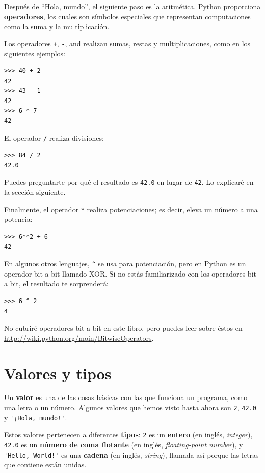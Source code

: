 \documentclass[10pt]{book}
\begin{document}
Después de ``Hola, mundo'', el siguiente paso es la aritmética.  Python
proporciona {\bf operadores}, los cuales son símbolos especiales que
representan computaciones como la suma y la multiplicación.

Los operadores {\tt +}, {\tt -}, and {\tt *} realizan sumas,
restas y multiplicaciones, como en los siguientes ejemplos:

\begin{verbatim}
>>> 40 + 2
42
>>> 43 - 1
42
>>> 6 * 7
42
\end{verbatim}
%
El operador {\tt /} realiza divisiones:

\begin{verbatim}
>>> 84 / 2
42.0
\end{verbatim}
%
Puedes preguntarte por qué el resultado es {\tt 42.0} en lugar de {\tt 42}.
Lo explicaré en la sección siguiente.

Finalmente, el operador {\tt **} realiza potenciaciones; es decir,
eleva un número a una potencia:

\begin{verbatim}
>>> 6**2 + 6
42
\end{verbatim}
%
En algunos otros lenguajes, \verb"^" se usa para potenciación, pero
en Python es un operador bit a bit llamado XOR.  Si no estás familiarizado
con los operadores bit a bit, el resultado te sorprenderá:

\begin{verbatim}
>>> 6 ^ 2
4
\end{verbatim}
%
No cubriré
operadores bit a bit en este libro, pero puedes leer sobre
éstos en \url{http://wiki.python.org/moin/BitwiseOperators}.


\section{Valores y tipos}

Un {\bf valor} es una de las cosas básicas con las que funciona un programa,
como una letra o un número.  Algunos valores que hemos visto hasta ahora son
{\tt 2}, {\tt 42.0} y \verb"'¡Hola, mundo!'".

Estos valores pertenecen a diferentes {\bf tipos}: {\tt 2} es un {\bf entero}
(en inglés, {\em integer}), {\tt 42.0} es un {\bf número de coma flotante} (en
inglés, {\em floating-point number}), y \verb"'Hello, World!'" es una {\bf
cadena} (en inglés, {\em string}), llamada así porque las letras que contiene están unidas.
\end{document}
